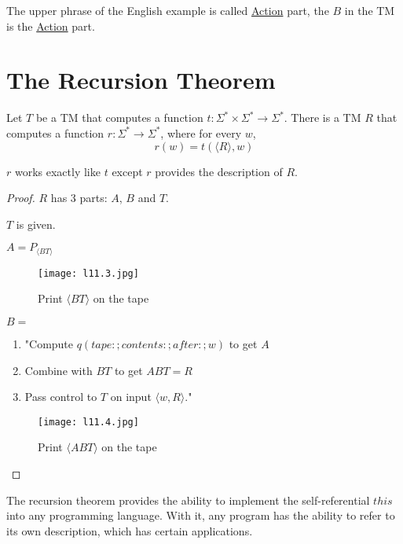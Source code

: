 The upper phrase of the English example is called \underline{Action} part, the \(B\) in the TM is the \underline{Action} part. 

\section{The Recursion Theorem}

\begin{theorem}
    Let \(T\) be a TM that computes a function \(t: \Sigma^* \times \Sigma^* \rightarrow \Sigma^*\). 
    There is a TM \(R\) that computes a function \(r:\Sigma^* \rightarrow \Sigma^*\), where for every \(w\),
    \[
        r(w) = t(\langle R \rangle, w)
    \]   
    \begin{remark}
        \(r\) works exactly like \(t\) except \(r\) provides the description of \(R\).    
    \end{remark}
\end{theorem}
\begin{proof}
    \(R\) has 3 parts: \(A\), \(B\) and \(T\).

    \(T\) is given. 

    \(A = P_{\langle BT \rangle}\) 

    \begin{figure}[H]
        \centering
        \texttt{[image: l11.3.jpg]}
        \caption{Print \(\langle BT \rangle\) on the tape}
    \end{figure}

    \(B = \) \begin{enumerate}
        \item "Compute \(q(tape :; contents :; after:; w)\) to get \(A\)
        \item Combine with \(BT\) to get \(ABT = R\)
        \item Pass control to \(T\) on input \(\langle w, R \rangle\)."      
    \end{enumerate} 

    \begin{figure}[H]
        \centering
        \texttt{[image: l11.4.jpg]}
        \caption{Print \(\langle ABT \rangle\) on the tape}
    \end{figure}
\end{proof}

\begin{note}
    The recursion theorem provides the ability to implement the self-referential \(this\) into any programming language. 
    With it, any program has the ability to refer to its own description, which has certain applications.
\end{note}

